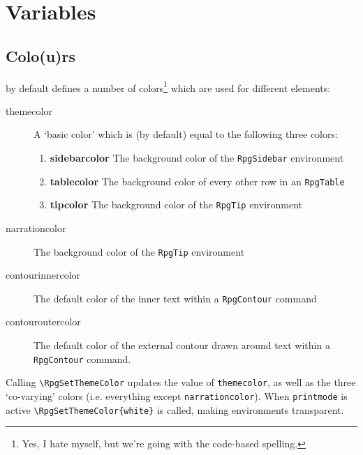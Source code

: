 \chapter{Variables}
	\section{Colo(u)rs}\label{S:Colors}

		\rpgtex{} by default defines a number of colors\footnote{Yes, I hate myself, but we're going with the code-based spelling.} which are used for different elements:
		\begin{description}
			\item[themecolor] A `basic color' which is (by default) equal to the following three colors:
			\begin{enumerate}
				\item \textbf{sidebarcolor} The background color of the \verb|RpgSidebar| environment
				\item \textbf{tablecolor} The background color of every other row in an \verb|RpgTable| 
				\item \textbf{tipcolor} The background color of the \verb|RpgTip| environment 
			\end{enumerate} 
			\item[narrationcolor]  The background color of the \verb|RpgTip| environment 
			\item[contourinnercolor]  The default color of the inner text within a \verb|RpgContour| command 
			\item[contouroutercolor]  The default color of the external contour drawn around text within a \verb|RpgContour| command.
		\end{description}

		Calling \verb|\RpgSetThemeColor|  updates the value of \verb|themecolor|, as well as the three `co-varying' colors (i.e. everything except \verb|narrationcolor|). When \verb|printmode| is active \verb|\RpgSetThemeColor{white}| is called, making environments transparent.
